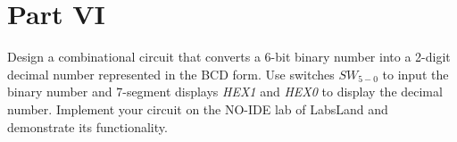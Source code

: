 \documentclass[epsfig,10pt,fullpage]{article}
\newcommand{\CommonDocsPath}{../../../common/docs}
\begin{document}
\section*{Part VI}
Design a combinational circuit that converts a 6-bit binary number into 
a 2-digit decimal number represented in the BCD form. 
Use switches $SW_{5-0}$ to input the binary number and 7-segment displays 
{\it HEX1} and {\it HEX0} to display the decimal number.
Implement your circuit on the NO-IDE lab of LabsLand and demonstrate its functionality.


\end{document}
